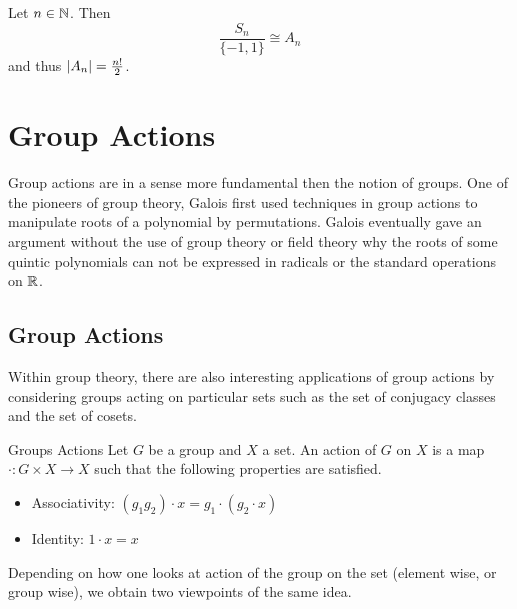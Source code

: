 \documentclass[a4paper]{article}
\begin{document}
\begin{lmm}{}{} Let $n\in\mathbb{N}$. Then $$\frac{S_n}{\{-1,1\}}\cong A_n$$ and thus $\abs{A_n}=\frac{n!}{2}$.
\end{lmm}

\pagebreak
\section{Group Actions}
Group actions are in a sense more fundamental then the notion of groups. One of the pioneers of group theory, Galois first used techniques in group actions to manipulate roots of a polynomial by permutations. Galois eventually gave an argument without the use of group theory or field theory why the roots of some quintic polynomials can not be expressed in radicals or the standard operations on $\mathbb{R}$. 

\subsection{Group Actions}
Within group theory, there are also interesting applications of group actions by considering groups acting on particular sets such as the set of conjugacy classes and the set of cosets. 

\begin{defn}{Groups Actions}{} Let $G$ be a group and $X$ a set. An action of $G$ on $X$ is a map $\cdot:G\times X\to X$ such that the following properties are satisfied. 
\begin{itemize}
\item Associativity: $(g_1g_2)\cdot x=g_1\cdot(g_2\cdot x)$
\item Identity: $1\cdot x=x$
\end{itemize}
\end{defn}

Depending on how one looks at action of the group on the set (element wise, or group wise), we obtain two viewpoints of the same idea. 
\end{document}
